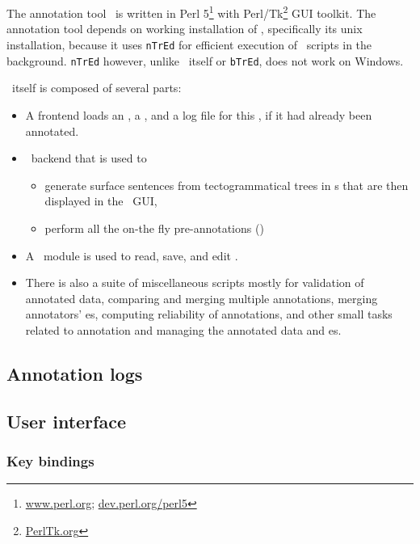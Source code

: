 
\chapter{\seman}
\label{sec:seman}
The annotation tool \seman\ is written in Perl 5\footnote{\url{www.perl.org}; \url{dev.perl.org/perl5}} with Perl/Tk\footnote{\url{PerlTk.org}} GUI toolkit. The annotation tool depends on working installation of \tred, specifically its unix installation, because it uses \texttt{nTrEd} for efficient execution of \tred\ scripts in the background. \texttt{nTrEd} however, unlike \tred\ itself or \texttt{bTrEd}, does not work on Windows.%

 \seman\ itself is composed of several parts:
\begin{itemize}
  \item A frontend loads an \sf, a \semlex,  and a log file for this \sf, if it had already been annotated. 
  \item \ntred\ backend that is used to 
	\begin{itemize}
	  \item generate surface sentences from tectogrammatical trees in \tf{}s that are then displayed in the \seman\ GUI,
	  \item perform all the on-the fly pre-annotations ()
	\end{itemize}
  \item A \semlex\ module is used to read, save, and edit \semlex.
  \item There is also a suite of miscellaneous scripts mostly for validation of annotated data, comparing and merging multiple annotations, merging annotators' \semlex{}es, computing reliability of annotations, and other small tasks related to annotation and managing the annotated data and \semlex{}es.
\end{itemize}

\section{Annotation logs}
\label{sec:logs}


\section{User interface}
\label{sec:seman:gui}

\subsection{Key bindings}


